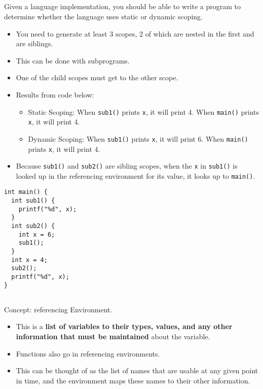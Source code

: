 \subsection{}
Given a language implementation, you should be able to write a program to determine whether the language uses static or dynamic scoping.

\begin{itemize}[noitemsep]
\item You need to generate at least 3 scopes, 2 of which are nested in the first and are siblings.
\item This can be done with subprograms.
\item One of the child scopes must get to the other scope.
\item Results from code below:
  \begin{itemize}[noitemsep]
  \item Static Scoping: When \texttt{sub1()} prints \texttt{x}, it will print 4. When \texttt{main()} prints \texttt{x}, it will print 4.
  \item Dynamic Scoping: When \texttt{sub1()} prints \texttt{x}, it will print 6. When \texttt{main()} prints \texttt{x}, it will print 4.
  \end{itemize}
\item Because \texttt{sub1()} and \texttt{sub2()} are sibling scopes, when the \texttt{x} in \texttt{sub1()} is looked up in the referencing environment for its value, it looks up to \texttt{main()}.
\end{itemize}

\begin{verbatim}
int main() {
  int sub1() {
    printf("%d", x);
  }
  int sub2() {
    int x = 6;
    sub1();
  }
  int x = 4;
  sub2();
  printf("%d", x);
}
\end{verbatim}

\subsection{}
Concept: referencing Environment.

\begin{itemize}[noitemsep]
\item This is a \textbf{list of variables to their types, values, and any other information that must be maintained} about the variable.
\item Functions also go in referencing environments.
\item This can be thought of as the list of names that are usable at any given point in time, and the environment maps these names to their other information.
\end{itemize}

